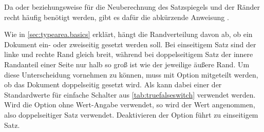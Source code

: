 Da %
%
 oder
%
 beziehungsweise
 für die Neuberechnung
des Satzspiegels und der Ränder recht häufig benötigt werden, gibt es dafür
die abkürzende Anweisung
.
\iffalse %
\begin{Example}
  Wenn Ihnen die Schreibweisen
\begin{lstcode}
  \KOMAoptions{DIV=last}
\end{lstcode}
  oder
\begin{lstcode}
  \typearea[current]{last}
\end{lstcode}
  für die Neuberechnung von Satzspiegel und Rändern aufgrund der vielen
  Sonderzeichen zu umständlich ist, können Sie einfach
\begin{lstcode}
  \recalctypearea
\end{lstcode}
  verwenden.
\end{Example}%
\vskip -1\ht\strutbox plus .75\ht\strutbox%
\fi
\EndIndexGroup


\begin{Declaration}
\end{Declaration}%
Wie in \autoref{sec:typearea.basics} erklärt, hängt
die Randverteilung davon ab, ob ein Dokument ein- oder zweiseitig gesetzt
werden soll. Bei einseitigem Satz sind der linke und rechte Rand gleich
breit, während bei doppelseitigem Satz der innere Randanteil einer Seite nur
halb so groß ist wie der jeweilige äußere Rand. Um diese Unterscheidung
vornehmen zu können, muss  mit Option 
mitgeteilt werden, ob das Dokument doppelseitig gesetzt wird. Als
 kann dabei einer der Standardwerte
für einfache Schalter aus \autoref{tab:truefalseswitch} verwendet werden. Wird
die Option ohne Wert-Angabe verwendet, so wird der Wert
 angenommen, also
doppelseitiger Satz verwendet. Deaktivieren der
Option führt zu einseitigem Satz.

